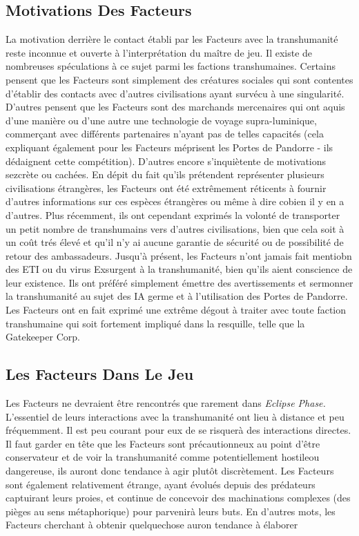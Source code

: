 \subsection{Motivations Des Facteurs} 

La motivation derrière le contact établi par les Facteurs avec la transhumanité reste inconnue et ouverte à l'interprétation du maître de jeu. Il existe de nombreuses spéculations à ce sujet parmi les factions transhumaines. Certains pensent que les Facteurs sont simplement des créatures sociales qui sont contentes d'établir des contacts avec d'autres civilisations ayant survécu à une singularité. D'autres pensent que les Facteurs sont des marchands mercenaires qui ont aquis d'une manière ou d'une autre une technologie de voyage supra-luminique, commerçant avec différents partenaires n'ayant pas de telles capacités (cela expliquant également pour les Facteurs méprisent les Portes de Pandorre - ils dédaignent cette compétition). D'autres encore s'inquiètente de motivations sezcrète ou cachées. En dépit du fait qu'ils prétendent représenter plusieurs civilisations étrangères, les Facteurs ont été extrêmement réticents à fournir d'autres informations sur ces espèces étrangères ou même à dire cobien il y en a d'autres. Plus récemment, ils ont cependant exprimés la volonté de transporter un petit nombre de transhumains vers d'autres civilisations, bien que cela soit à un coût trés élevé et qu'il n'y ai aucune garantie de sécurité ou de possibilité de retour des ambassadeurs. Jusqu'à présent, les Facteurs n'ont jamais fait mentiobn des ETI ou du virus Exsurgent à la transhumanité, bien qu'ils aient conscience de leur existence. Ils ont préféré simplement émettre des avertissements et sermonner la transhumanité au sujet des IA germe et à l'utilisation des Portes de Pandorre. Les Facteurs ont en fait exprimé une extrême dégout à traiter avec toute faction transhumaine qui soit fortement impliqué dans la resquille, telle que la Gatekeeper Corp. 

\subsection{Les Facteurs Dans Le Jeu} 

Les Facteurs ne devraient être rencontrés que rarement dans \textit{Eclipse Phase.} L'essentiel de leurs interactions avec la transhumanité ont lieu à distance et peu fréquemment. Il est peu courant pour eux de se risquerà des interactions directes. Il faut garder en tête que les Facteurs sont précautionneux au point d'être conservateur et de voir la transhumanité comme potentiellement hostileou dangereuse, ils auront donc tendance à agir plutôt discrètement. Les Facteurs sont également relativement étrange, ayant évolués depuis des prédateurs captuirant leurs proies, et continue de concevoir des machinations complexes (des pièges au sens métaphorique) pour parvenirà leurs buts. En d'autres mots, les Facteurs cherchant à obtenir quelquechose auron tendance à élaborer 


